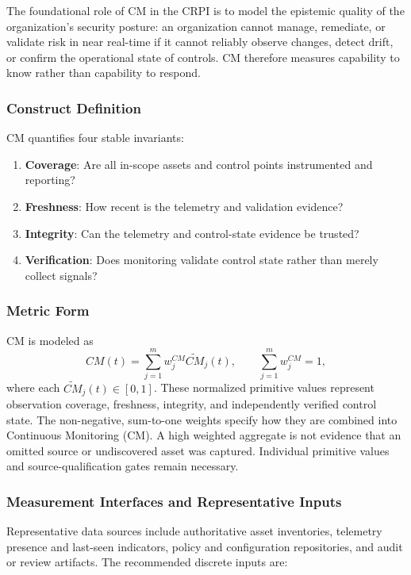 \documentclass[11pt]{article}
\begin{document}
The foundational role of CM in the CRPI is to model the epistemic quality of the
organization’s security posture: an organization cannot manage, remediate, or validate
risk in near real-time if it cannot reliably observe changes, detect drift, or confirm
the operational state of controls. CM therefore measures capability to know rather than
capability to respond.

\subsubsection{Construct Definition}
CM quantifies four stable invariants:
\begin{enumerate}
  \item \textbf{Coverage}: Are all in-scope assets and control points instrumented and
    reporting?
  \item \textbf{Freshness}: How recent is the telemetry and validation evidence?
  \item \textbf{Integrity}: Can the telemetry and control-state evidence be trusted?
  \item \textbf{Verification}: Does monitoring validate control state rather than merely
    collect signals?
\end{enumerate}

\subsubsection{Metric Form}
CM is modeled as
\begin{equation}
  CM(t)=\sum_{j=1}^{m} w_j^{CM}\widetilde{CM}_j(t),
  \qquad \sum_{j=1}^{m}w_j^{CM}=1,
\end{equation}
where each $\widetilde{CM}_j(t)\in[0,1]$.
These normalized primitive values represent observation coverage,
freshness, integrity, and independently verified control state.
The non-negative, sum-to-one weights specify how they are combined
into Continuous Monitoring (CM). A high weighted aggregate is not
evidence that an omitted source or undiscovered asset was captured.
Individual primitive values and source-qualification gates remain
necessary.

\subsubsection{Measurement Interfaces and Representative Inputs}
Representative data sources include authoritative asset inventories, telemetry
presence and last-seen indicators, policy and configuration repositories, and audit or
review artifacts. The recommended discrete inputs are:
\end{document}
